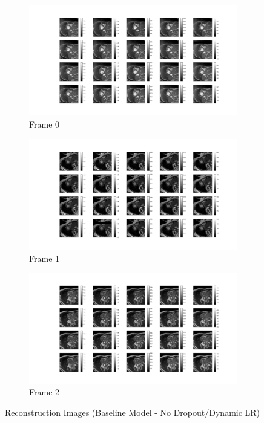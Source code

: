 \documentclass{article}
\begin{document}
\begin{figure}[H]
  \centering
  \begin{subfigure}[b]{0.32\linewidth}
    \includegraphics[width=\linewidth]{../images/No_opt/reconstruction/reconstruction_0.png}
    \caption{Frame 0}
  \end{subfigure}
  \begin{subfigure}[b]{0.32\linewidth}
    \includegraphics[width=\linewidth]{../images/No_opt/reconstruction/reconstruction_1.png}
    \caption{Frame 1}
  \end{subfigure}
  \begin{subfigure}[b]{0.32\linewidth}
    \includegraphics[width=\linewidth]{../images/No_opt/reconstruction/reconstruction_2.png}
    \caption{Frame 2}
  \end{subfigure}
  \caption{Reconstruction Images (Baseline Model - No Dropout/Dynamic LR)}
  \label{fig:reconstructed_no_opt}
\end{figure}
\end{document}
